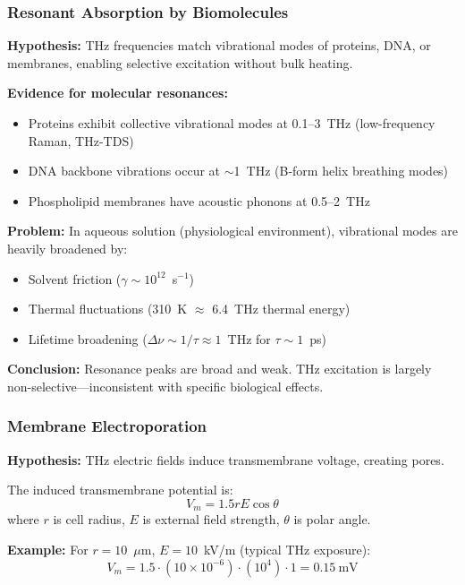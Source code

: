 \subsubsection{Resonant Absorption by Biomolecules}

\textbf{Hypothesis:} THz frequencies match vibrational modes of proteins, DNA, or membranes, enabling selective excitation without bulk heating.

\textbf{Evidence for molecular resonances:}
\begin{itemize}
\item Proteins exhibit collective vibrational modes at 0.1--3~THz (low-frequency Raman, THz-TDS)
\item DNA backbone vibrations occur at $\sim$1~THz (B-form helix breathing modes)
\item Phospholipid membranes have acoustic phonons at 0.5--2~THz
\end{itemize}

\textbf{Problem:} In aqueous solution (physiological environment), vibrational modes are heavily broadened by:
\begin{itemize}
\item Solvent friction ($\gamma \sim 10^{12}$~s$^{-1}$)
\item Thermal fluctuations (310~K $\approx$ 6.4~THz thermal energy)
\item Lifetime broadening ($\Delta \nu \sim 1/\tau \approx 1$~THz for $\tau \sim 1$~ps)
\end{itemize}

\textbf{Conclusion:} Resonance peaks are broad and weak. THz excitation is largely non-selective---inconsistent with specific biological effects.

\subsubsection{Membrane Electroporation}

\textbf{Hypothesis:} THz electric fields induce transmembrane voltage, creating pores.

The induced transmembrane potential is:
\begin{equation}
V_m = 1.5 r E \cos\theta
\label{eq:membrane-voltage}
\end{equation}
where $r$ is cell radius, $E$ is external field strength, $\theta$ is polar angle.

\textbf{Example:} For $r = 10$~$\mu$m, $E = 10$~kV/m (typical THz exposure):
\begin{equation}
V_m = 1.5 \cdot (10 \times 10^{-6}) \cdot (10^4) \cdot 1 = 0.15~\text{mV}
\end{equation}

